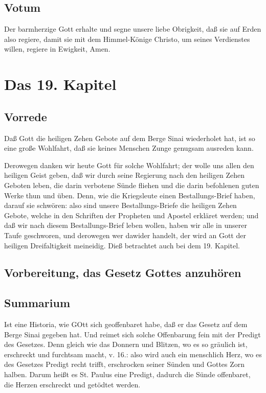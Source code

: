 \section{Votum}

Der barmherzige Gott erhalte und segne unsere liebe Obrigkeit, daß sie auf Erden also regiere, damit sie mit dem Himmel-Könige Christo, um seines Verdienstes willen, regiere in Ewigkeit, Amen.

\chapter{Das 19. Kapitel}

\section{Vorrede}

Daß Gott die heiligen Zehen Gebote auf dem Berge Sinai wiederholet hat, ist so eine große Wohlfahrt, daß sie keines Menschen Zunge genugsam ausreden kann.

Derowegen danken wir heute Gott für solche Wohlfahrt; der wolle uns allen den heiligen Geist geben, daß wir durch seine Regierung nach den heiligen Zehen Geboten leben, die darin verbotene Sünde fliehen und die darin befohlenen guten Werke thun und üben. Denn, wie die Kriegsleute einen Bestallungs-Brief haben, darauf sie schwören: also sind unsere Bestallungs-Briefe die heiligen Zehen Gebote, welche in den Schriften der Propheten und Apostel erkläret werden; und daß wir nach diesem Bestallungs-Brief leben wollen, haben wir alle in unserer Taufe geschworen, und derowegen wer dawider handelt, der wird an Gott der heiligen Dreifaltigkeit meineidig. Dieß betrachtet auch bei dem 19. Kapitel.

\section{Vorbereitung, das Gesetz Gottes anzuhören}

\section{Summarium}

Ist eine Historia, wie GOtt sich geoffenbaret habe, daß er das Gesetz auf dem Berge Sinai gegeben hat. Und reimet sich solche Offenbarung fein mit der Predigt des Gesetzes. Denn gleich wie das Donnern und Blitzen, wo es so gräulich ist, erschreckt und furchtsam macht, v. 16.: also wird auch ein menschlich Herz, wo es des Gesetzes Predigt recht trifft, erschrocken seiner Sünden und Gottes Zorn halben. Darum heißt es St. Paulus eine Predigt, dadurch die Sünde offenbaret, die Herzen erschreckt und getödtet werden.

